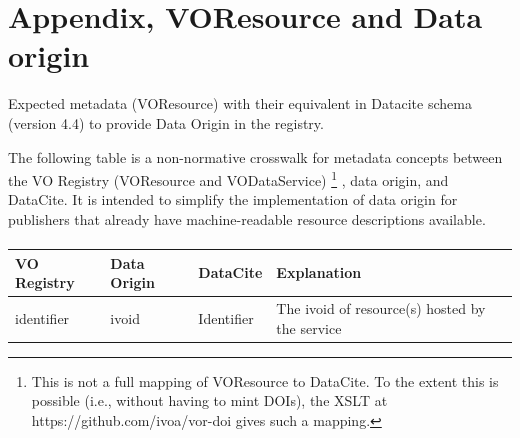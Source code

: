 \documentclass[11pt,a4paper]{ivoa}
\begin{document}
\section{Appendix, VOResource and Data origin}\label{sec:appendixB}
Expected metadata (VOResource) with their equivalent in Datacite schema (version 4.4) to provide Data Origin in the registry.\\


\label{tab:voresourcemapping}

The following table is a non-normative crosswalk for metadata
concepts between the VO Registry (VOResource and VODataService)
\footnote{This is not a full mapping of VOResource to DataCite.  To the extent
	this is possible (i.e., without having to mint DOIs), the XSLT at
	https://github.com/ivoa/vor-doi gives such a mapping.}
, data origin, and DataCite.  It is
intended to simplify the implementation of data origin for
publishers that already have machine-readable resource descriptions
available. 

\paragraph{}

\begin{tabular}{|p{2.8cm}|p{3cm}|p{3cm}|p{4cm}|} \hline
\textbf{VO Registry} & \textbf{Data Origin} & \textbf{DataCite} & \textbf{Explanation} \\ \hline
identifier    &ivoid & Identifier & The ivoid of resource(s) hosted by the service\\ \hline
\end{tabular}
\end{document}
